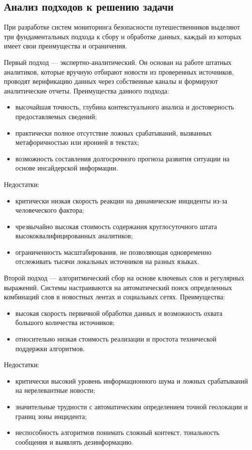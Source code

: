 \subsection{Анализ подходов к решению задачи}

При разработке систем мониторинга безопасности путешественников выделяют три фундаментальных подхода к сбору и обработке данных, каждый из которых имеет свои преимущества и ограничения.

Первый подход — экспертно-аналитический. Он основан на работе штатных аналитиков, которые вручную отбирают новости из проверенных источников, проводят верификацию данных через собственные каналы и формируют аналитические отчеты.
Преимущества данного подхода:
\begin{itemize}
\item высочайшая точность, глубина контекстуального анализа и достоверность предоставляемых сведений;
    \item практически полное отсутствие ложных срабатываний, вызванных метафоричностью или иронией в текстах;
    \item возможность составления долгосрочного прогноза развития ситуации на основе инсайдерской информации.
\end{itemize}
Недостатки:
\begin{itemize}
\item критически низкая скорость реакции на динамические инциденты из-за человеческого фактора;
    \item чрезвычайно высокая стоимость содержания круглосуточного штата высококвалифицированных аналитиков;
    \item ограниченность масштабирования, не позволяющая одновременно отслеживать тысячи локальных источников на разных языках.
\end{itemize}

Второй подход — алгоритмический сбор на основе ключевых слов и регулярных выражений. Системы настраиваются на автоматический поиск определенных комбинаций слов в новостных лентах и социальных сетях.
Преимущества:
\begin{itemize}
\item высокая скорость первичной обработки данных и возможность охвата большого количества источников;
    \item относительно низкая стоимость реализации и простота технической поддержки алгоритмов.
\end{itemize}
Недостатки:
\begin{itemize}
\item критически высокий уровень информационного шума и ложных срабатываний на нерелевантные новости;
    \item значительные трудности с автоматическим определением точной геолокации и границ зоны инцидента;
    \item неспособность алгоритмов понимать сложный контекст, тональность сообщения и выявлять дезинформацию.
\end{itemize}


